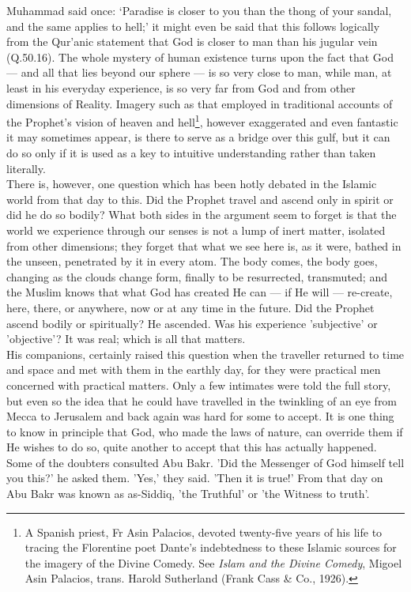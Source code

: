 \documentclass[10pt, twoside,openright]{book}
\begin{document}
Muhammad said once: `Paradise is closer to you than the thong of your sandal, and the same applies to hell;' it might even be said that this follows logically from the Qur'anic statement that God is 
closer to man than his jugular vein (Q.50.16). The whole mystery of human existence turns upon the 
fact that God --- and all that lies beyond our sphere --- is so very close to man, while man, at least in 
his everyday experience, is so very far from God and from other dimensions of Reality. Imagery such 
as that employed in traditional accounts of the Prophet's vision of heaven and hell\footnote{A Spanish priest, Fr Asin Palacios, devoted twenty-five years of his life to tracing the Florentine poet Dante's indebtedness to these Islamic sources for the imagery of the Divine Comedy. See \emph{Islam and the Divine Comedy}, Migoel Asin Palacios, trans. Harold Sutherland (Frank Cass \& Co., 1926).}, however 
exaggerated and even fantastic it may sometimes appear, is there to serve as a bridge over this gulf, 
but it can do so only if it is used as a key to intuitive understanding rather than taken literally. \\ 

There is, however, one question which has been hotly debated in the Islamic world from that day to 
this. Did the Prophet travel and ascend only in spirit or did he do so bodily? What both sides in the 
argument seem to forget is that the world we experience through our senses is not a lump of inert 
matter, isolated from other dimensions; they forget that what we see here is, as it were, bathed in 
the unseen, penetrated by it in every atom. The body comes, the body goes, changing as the clouds 
change form, finally to be resurrected, transmuted; and the Muslim knows that what God has created He 
can --- if He will --- re-create, here, there, or anywhere, now or at any time in the future. Did the 
Prophet ascend bodily or spiritually? He ascended. Was his experience 'subjective' or 'objective'? It 
was real; which is all that matters. \\

His companions, certainly raised this question when the traveller returned to time and space and met 
with them in the earthly day, for they were practical men concerned with practical matters. Only a 
few intimates were told the full story, but even so the idea that he could have travelled in the 
twinkling of an eye from Mecca to Jerusalem and back again was hard for some to accept. It is one 
thing to know in principle that God, who made the laws of nature, can override them if He wishes to 
do so, quite another to accept that this has actually happened. Some of the doubters consulted Abu 
Bakr. 'Did the Messenger of God himself tell you this?' he asked them. 'Yes,' they said. 'Then it is 
true!' From that day on Abu Bakr was known as as\hyp{}Siddiq, 'the Truthful' or 'the Witness to truth'. \\
\end{document}
